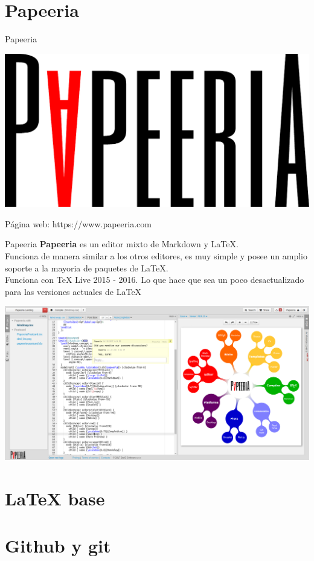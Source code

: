 \documentclass[12pt,aspectratio=43]{beamer}
\newcommand{\lmr}{\fontfamily{lmr}\selectfont}
\begin{document}
\section{Papeeria}
\begin{frame}{Papeeria}{}
\begin{center}
	\includegraphics[width=0.7\linewidth]{Papeeria_Logo}
\end{center}

Página web: https://www.papeeria.com
\end{frame}

\begin{frame}{Papeeria}{}
\alert{\bf Papeeria} es un editor mixto de Markdown y LaTeX.\pause\\[1em]

Funciona de manera similar a los otros editores, es muy simple y posee un amplio soporte a la mayoria de paquetes de {\lmr\LaTeX}.\pause\\[1em]

Funciona con {\lmr\TeX} Live 2015 - 2016. Lo que hace que sea un poco desactualizado para las versiones actuales de {\lmr\LaTeX}
\end{frame}

\begin{frame}[plain]{}{}
\includegraphics[width=\linewidth]{Papeeria_Screen}
\end{frame}

\section{LaTeX base}

\section{Github y git}
\end{document}
